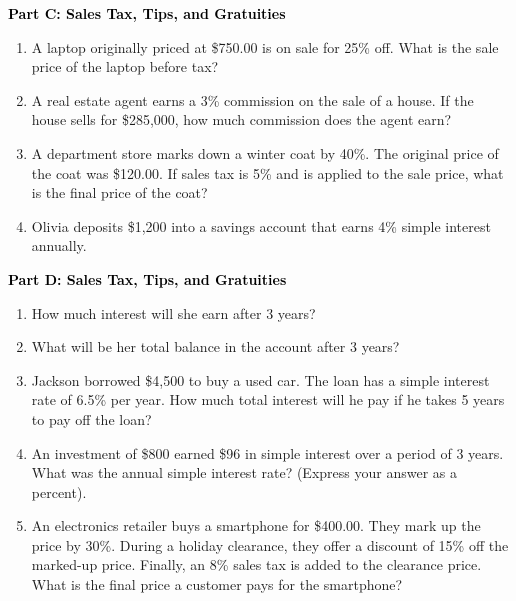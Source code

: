 \documentclass[12pt, letterpaper, fleqn]{article}
\newcommand{\blank}{\underline{\hspace{2.2cm}}}
\begin{document}
\newpage

\begin{tcolorbox}[colback=customteal!20]
\large\textcolor{black}{\textbf{Part C: Sales Tax, Tips, and Gratuities}}
\end{tcolorbox}

\vspace{3mm}

\begin{enumerate}[itemsep=2.5cm, leftmargin=0.6cm, resume]
\begin{itemize}
\item What is the retail price of the sneakers? \blank
\end{itemize}
\item A laptop originally priced at \$750.00 is on sale for 25\% off. What is the sale price of the laptop before tax?
\item A real estate agent earns a 3\% commission on the sale of a house. If the house sells for \$285,000, how much commission does the agent earn?
\item A department store marks down a winter coat by 40\%. The original price of the coat was \$120.00. If sales tax is 5\% and is applied to the sale price, what is the final price of the coat?
\item Olivia deposits \$1,200 into a savings account that earns 4\% simple interest annually. 
\end{enumerate}

\newpage

\begin{tcolorbox}[colback=customteal!20]
\large\textcolor{black}{\textbf{Part D: Sales Tax, Tips, and Gratuities}}
\end{tcolorbox}

\vspace{3mm}

\begin{enumerate}[itemsep=2.5cm, leftmargin=0.6cm, resume]
\item How much interest will she earn after 3 years? \blank
\item What will be her total balance in the account after 3 years? \blank
\item Jackson borrowed \$4,500 to buy a used car. The loan has a simple interest rate of 6.5\% per year. How much total interest will he pay if he takes 5 years to pay off the loan?
\item An investment of \$800 earned \$96 in simple interest over a period of 3 years. What was the annual simple interest rate? (Express your answer as a percent).
\item An electronics retailer buys a smartphone for \$400.00. They mark up the price by 30\%. During a holiday clearance, they offer a discount of 15\% off the marked-up price. Finally, an 8\% sales tax is added to the clearance price. What is the final price a customer pays for the smartphone?
\end{enumerate}
\end{document}
